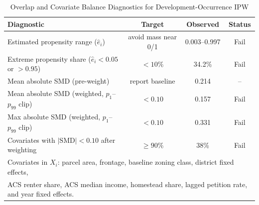 \begin{table}[H]
\centering
\caption{Overlap and Covariate Balance Diagnostics for Development-Occurrence IPW}
\label{tab:ipw_balance}
\begin{tabular}{lccc}
\toprule
\textbf{Diagnostic} & \textbf{Target} & \textbf{Observed} & \textbf{Status} \\
\midrule
Estimated propensity range ($\hat e_i$) & avoid mass near 0/1 & 0.003--0.997 & Fail \\
Extreme propensity share ($\hat e_i<0.05$ or $>0.95$) & $<10\%$ & 34.2\% & Fail \\
Mean absolute SMD (pre-weight) & report baseline & 0.214 & -- \\
Mean absolute SMD (weighted, $p_1$--$p_{99}$ clip) & $<0.10$ & 0.157 & Fail \\
Max absolute SMD (weighted, $p_1$--$p_{99}$ clip) & $<0.10$ & 0.331 & Fail \\
Covariates with $|\mathrm{SMD}|<0.10$ after weighting & $\ge 90\%$ & 38\% & Fail \\
\bottomrule
\multicolumn{4}{l}{\footnotesize Covariates in $X_i$: parcel area, frontage, baseline zoning class, district fixed effects,} \\
\multicolumn{4}{l}{\footnotesize ACS renter share, ACS median income, homestead share, lagged petition rate, and year fixed effects.} \\
\end{tabular}
\end{table}
